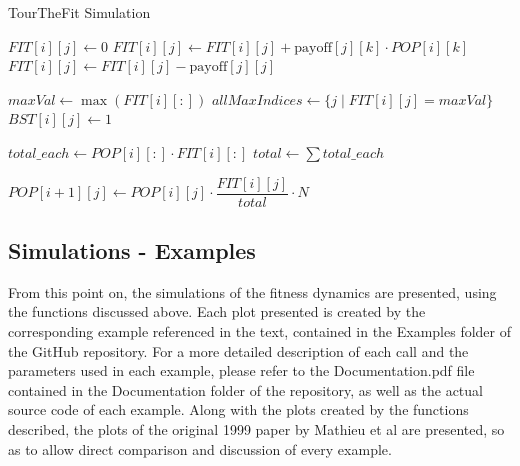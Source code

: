 \documentclass[12pt]{article}
\begin{document}
\begin{algorithm}
\caption{TourTheFit Simulation}
\begin{algorithmic}[1]
        \STATE $FIT[i][j] \gets 0$
            \STATE $FIT[i][j] \gets FIT[i][j] + \text{payoff}[j][k] \cdot POP[i][k]$
        \ENDFOR
        \STATE $FIT[i][j] \gets FIT[i][j] - \text{payoff}[j][j]$
    \ENDFOR

    \STATE $maxVal \gets \max(FIT[i][:])$
    \STATE $allMaxIndices \gets \{j \mid FIT[i][j] = maxVal\}$
        \STATE $BST[i][j] \gets 1$
    \ENDFOR

    \STATE $total\_each \gets POP[i][:] \cdot FIT[i][:]$ 
    \STATE $total \gets \sum total\_each$

        \STATE $POP[i+1][j] \gets POP[i][j] \cdot \dfrac{FIT[i][j]}{total} \cdot N$
    \ENDFOR
\ENDFOR
\end{algorithmic}
\end{algorithm}

\subsection{Simulations - Examples}
From this point on, the simulations of the fitness dynamics are presented, using the functions discussed above. Each plot presented is created by the corresponding example referenced in the text, contained in the Examples folder of the GitHub repository. For a more detailed description of each call and the parameters used in each example, please refer to the Documentation.pdf file contained in the Documentation folder of the repository, as well as the actual source code of each example. Along with the plots created by the functions described, the plots of the original 1999 paper by Mathieu et al are presented, so as to allow direct comparison and discussion of every example. 
\end{document}
